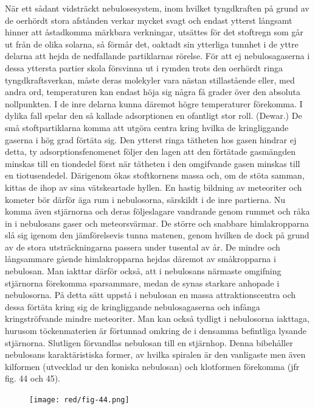 \documentclass[a4paper, 12pt, oneside, swedish]{article}
\begin{document}
När ett sådant vidsträckt nebulosesystem, inom hvilket tyngdkraften på grund av de oerhördt stora afstånden verkar mycket svagt och endast ytterst långsamt hinner att åstadkomma märkbara verkningar, utsättes för det stoftregn som går ut från de olika solarna, så förmår det, oaktadt sin ytterliga tunnhet i de yttre delarna att hejda de nedfallande partiklarnas rörelse. För att ej nebulosagaserna i dessa yttersta partier skola försvinna ut i rymden trots den oerhördt ringa tyngdkraftsverkan, måste deras molekyler vara nästan stillastående eller, med andra ord, temperaturen kan endast höja sig några få grader över den absoluta nollpunkten. I de inre delarna kunna däremot högre temperaturer förekomma. I dylika fall spelar den så kallade adsorptionen en ofantligt stor roll. (Dewar.) De små stoftpartiklarna komma att utgöra centra kring hvilka de kringliggande gaserna i hög grad förtäta sig. Den ytterst ringa tätheten hos gasen hindrar ej detta, ty adsorptionsfenomenet följer den lagen att den förtätade gasmängden minskas till en tiondedel först när tätheten i den omgifvande gasen minskas till en tiotusendedel. Därigenom ökas stoftkornens massa och, om de stöta samman, kittas de ihop av sina vätskeartade hyllen. En hastig bildning av meteoriter och kometer bör därför äga rum i nebulosorna, särskildt i de inre partierna. Nu komma även stjärnorna och deras följeslagare vandrande genom rummet och råka in i nebulosans gaser och meteorsvärmar. De större och snabbare himlakropparna slå sig igenom den jämförelsevis tunna matenen, genom hvilken de dock på grund av de stora utsträckningarna passera under tusental av år. De mindre och långsammare gående himlakropparna hejdas däremot av småkropparna i nebulosan. Man iakttar därför också, att i nebulosans närmaste omgifning stjärnorna förekomma sparsammare, medan de synas starkare anhopade i nebulosorna. På detta sätt uppstå i nebulosan en massa attraktionscentra och dessa förtäta kring sig de kringliggande nebulosagaserna och infånga kringströfvande mindre meteoriter. Man kan också tydligt i nebulosorna iakttaga, hurusom töckenmaterien är förtunnad omkring de i densamma befintliga lysande stjärnorna. Slutligen förvandlas nebulosan till en stjärnhop. Denna bibehåller nebulosans karaktäristiska former, av hvilka spiralen är den vanligaste men även kilformen (utvecklad ur den koniska nebulosan) och klotformen förekomma (jfr fig. 44 och 45).

\begin{figure}[H]
\centering
\texttt{[image: red/fig-44.png]}
\caption{}
\end{figure}
\end{document}
